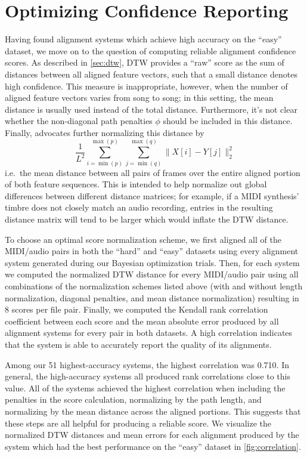 \section{Optimizing Confidence Reporting}
\label{sec:confidence}

Having found alignment systems which achieve high accuracy on the ``easy'' dataset, we move on to the question of computing reliable alignment confidence scores.
As described in \cref{sec:dtw}, DTW provides a ``raw'' score as the sum of distances between all aligned feature vectors, such that a small distance denotes high confidence.
This measure is inappropriate, however, when the number of aligned feature vectors varies from song to song; in this setting, the mean distance is usually used instead of the total distance.
Furthermore, it's not clear whether the non-diagonal path penalties $\phi$ should be included in this distance.
Finally, \cite{raffel2015large} advocates further normalizing this distance by
\begin{equation}
\frac{1}{L^2} \sum_{i = \min(p)}^{\max(p)} \sum_{j = \min(q)}^{\max(q)} \|X[i] - Y[j]\|_2^2
\label{eq:dtw_mean_distance_normalization}
\end{equation}
i.e.\ the mean distance between all pairs of frames over the entire aligned portion of both feature sequences.
This is intended to help normalize out global differences between different distance matrices; for example, if a MIDI synthesis' timbre does not closely match an audio recording, entries in the resulting distance matrix will tend to be larger which would inflate the DTW distance.

To choose an optimal score normalization scheme, we first aligned all of the MIDI/audio pairs in both the ``hard'' and ``easy'' datasets using every alignment system generated during our Bayesian optimization trials.
Then, for each system we computed the normalized DTW distance for every MIDI/audio pair using all combinations of the normalization schemes listed above (with and without length normalization, diagonal penalties, and mean distance normalization) resulting in 8 scores per file pair.
Finally, we computed the Kendall rank correlation coefficient \cite{kendall1938new} between each score and the mean absolute error produced by all alignment systems for every pair in both datasets.
A high correlation indicates that the system is able to accurately report the quality of its alignments.

Among our 51 highest-accuracy systems, the highest correlation was 0.710.
In general, the high-accuracy systems all produced rank correlations close to this value.
All of the systems achieved the highest correlation when including the penalties in the score calculation, normalizing by the path length, and normalizing by the mean distance across the aligned portions.
This suggests that these steps are all helpful for producing a reliable score.
We visualize the normalized DTW distances and mean errors for each alignment produced by the system which had the best performance on the ``easy'' dataset in \cref{fig:correlation}.

